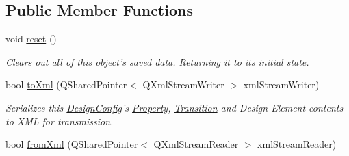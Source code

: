 \subsection*{Public Member Functions}
\begin{DoxyCompactItemize}
\item 
\hypertarget{class_picto_1_1_design_config_a86faf6a6691d4c02874022f6296a5baf}{void \hyperlink{class_picto_1_1_design_config_a86faf6a6691d4c02874022f6296a5baf}{reset} ()}\label{class_picto_1_1_design_config_a86faf6a6691d4c02874022f6296a5baf}

\begin{DoxyCompactList}\small\item\em Clears out all of this object's saved data. Returning it to its initial state. \end{DoxyCompactList}\item 
\hypertarget{class_picto_1_1_design_config_aea99cb30f6004cf320a6a578a826379d}{bool \hyperlink{class_picto_1_1_design_config_aea99cb30f6004cf320a6a578a826379d}{to\-Xml} (Q\-Shared\-Pointer$<$ Q\-Xml\-Stream\-Writer $>$ xml\-Stream\-Writer)}\label{class_picto_1_1_design_config_aea99cb30f6004cf320a6a578a826379d}

\begin{DoxyCompactList}\small\item\em Serializes this \hyperlink{class_picto_1_1_design_config}{Design\-Config}'s \hyperlink{class_picto_1_1_property}{Property}, \hyperlink{class_picto_1_1_transition}{Transition} and Design Element contents to X\-M\-L for transmission. \end{DoxyCompactList}\item 
\hypertarget{class_picto_1_1_design_config_ad25cd87f54e11ebc780f871f41c17392}{bool \hyperlink{class_picto_1_1_design_config_ad25cd87f54e11ebc780f871f41c17392}{from\-Xml} (Q\-Shared\-Pointer$<$ Q\-Xml\-Stream\-Reader $>$ xml\-Stream\-Reader)}\label{class_picto_1_1_design_config_ad25cd87f54e11ebc780f871f41c17392}


\end{DoxyCompactItemize}
